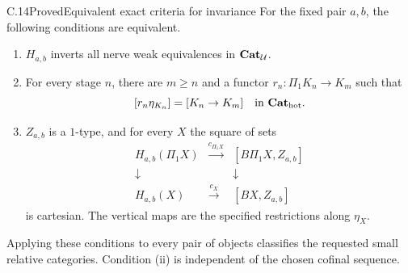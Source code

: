 \begin{claim}{C.14}{Proved}{Equivalent exact criteria for invariance}
For the fixed pair $a,b$, the following conditions are equivalent.
\begin{enumerate}[label=(\roman*)]
\item $H_{a,b}$ inverts all nerve weak equivalences in $\mathbf{Cat}_\mathcal U$.
\item For every stage $n$, there are $m\geq n$ and a functor $r_n:\Pi_1K_n\to K_m$ such that
\[
 [r_n\eta_{K_n}]=[K_n\to K_m]\quad\text{in }{\mathbf{Cat}_{\mathrm{hot}}}.
\]
\item $Z_{a,b}$ is a $1$-type, and for every $X$ the square of sets
\[
 \begin{array}{ccc}
 H_{a,b}(\Pi_1X)&\xrightarrow{c_{\Pi_1X}}&[B\Pi_1X,Z_{a,b}]\\
 \downarrow&&\downarrow\\
 H_{a,b}(X)&\xrightarrow{c_X}&[BX,Z_{a,b}]
 \end{array} \tag{C.14.1}
\]
is cartesian. The vertical maps are the specified restrictions along $\eta_X$.
\end{enumerate}
Applying these conditions to every pair of objects classifies the requested small relative categories. Condition (ii) is independent of the chosen cofinal sequence.
\end{claim}
